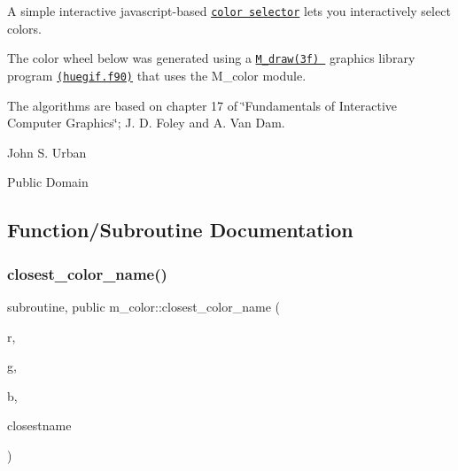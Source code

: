 \begin{DoxyDescription}
\item[S\+EE A\+L\+SO  ]



A simple interactive javascript-\/based \href{../../../public_html/javascript/color/iframe.html}{\tt color selector} lets you interactively select colors. 





The color wheel below was generated using a \href{BOOK_M_draw.html}{\tt M\+\_\+draw(3f) } graphics library program \href{../test/demos/huegif.f90}{\tt (huegif.\+f90)} that uses the M\+\_\+color module. 



\begin{center}  \end{center} 




\item[R\+E\+F\+E\+R\+E\+N\+C\+ES]The algorithms are based on chapter 17 of \char`\"{}\+Fundamentals of Interactive Computer Graphics\char`\"{}; J. D. Foley and A. Van Dam. 


\item[A\+U\+T\+H\+OR ]

John S. Urban




\item[L\+I\+C\+E\+N\+SE ]

Public Domain




\end{DoxyDescription}

\subsection{Function/\+Subroutine Documentation}
\mbox{\label{namespacem__color_acad72628ee0b77cf87f40cd46734fb18}} 
\subsubsection{\texorpdfstring{closest\+\_\+color\+\_\+name()}{closest\_color\_name()}}
{\footnotesize\ttfamily subroutine, public m\+\_\+color\+::closest\+\_\+color\+\_\+name (\begin{DoxyParamCaption}\item[{real, intent(in)}]{r,  }\item[{real, intent(in)}]{g,  }\item[{real, intent(in)}]{b,  }\item[{character(len=$\ast$), intent(out)}]{closestname }\end{DoxyParamCaption})}



